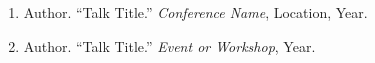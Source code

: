 \begin{enumerate} \itemsep -3pt
\item Author. “Talk Title.” \textit{Conference Name}, Location, Year.
\item Author. “Talk Title.” \textit{Event or Workshop}, Year.
\end{enumerate}
